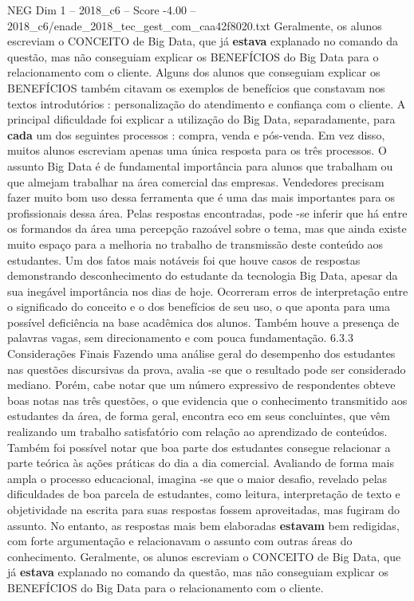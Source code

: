 \begin{textsample}{NEG Dim 1 – 2018\_c6 – Score -4.00 – 2018\_c6/enade\_2018\_tec\_gest\_com\_caa42f8020.txt}
Geralmente, os alunos escreviam o CONCEITO de Big Data, que já \textbf{estava} explanado no comando da questão, mas não conseguiam explicar os BENEFÍCIOS do Big Data para o relacionamento com o cliente.
Alguns dos alunos que conseguiam explicar os BENEFÍCIOS também citavam os exemplos de benefícios que constavam nos textos introdutórios : personalização do atendimento e confiança com o cliente.
A principal dificuldade foi explicar a utilização do Big Data, separadamente, para \textbf{cada} um dos seguintes processos : compra, venda e pós-venda.
Em vez disso, muitos alunos escreviam apenas uma única resposta para os três processos.
O assunto Big Data é de fundamental importância para alunos que trabalham ou que almejam trabalhar na área comercial das empresas.
Vendedores precisam fazer muito bom uso dessa ferramenta que é uma das mais importantes para os profissionais dessa área.
Pelas respostas encontradas, pode -se inferir que há entre os formandos da área uma percepção razoável sobre o tema, mas que ainda existe muito espaço para a melhoria no trabalho de transmissão deste conteúdo aos estudantes.
Um dos fatos mais notáveis foi que houve casos de respostas demonstrando desconhecimento do estudante da tecnologia Big Data, apesar da sua inegável importância nos dias de hoje.
Ocorreram erros de interpretação entre o significado do conceito e o dos benefícios de seu uso, o que aponta para uma possível deficiência na base acadêmica dos alunos.
Também houve a presença de palavras vagas, sem direcionamento e com pouca fundamentação. 6.3.3 Considerações Finais Fazendo uma análise geral do desempenho dos estudantes nas questões discursivas da prova, avalia -se que o resultado pode ser considerado mediano.
Porém, cabe notar que um número expressivo de respondentes obteve boas notas nas três questões, o que evidencia que o conhecimento transmitido aos estudantes da área, de forma geral, encontra eco em seus concluintes, que vêm realizando um trabalho satisfatório com relação ao aprendizado de conteúdos.
Também foi possível notar que boa parte dos estudantes consegue relacionar a parte teórica às ações práticas do dia a dia comercial.
Avaliando de forma mais ampla o processo educacional, imagina -se que o maior desafio, revelado pelas dificuldades de boa parcela de estudantes, como leitura, interpretação de texto e objetividade na escrita para suas respostas fossem aproveitadas, mas fugiram do assunto.
No entanto, as respostas mais bem elaboradas \textbf{estavam} bem redigidas, com forte argumentação e relacionavam o assunto com outras áreas do conhecimento.
Geralmente, os alunos escreviam o CONCEITO de Big Data, que já \textbf{estava} explanado no comando da questão, mas não conseguiam explicar os BENEFÍCIOS do Big Data para o relacionamento com o cliente.

\end{textsample}
